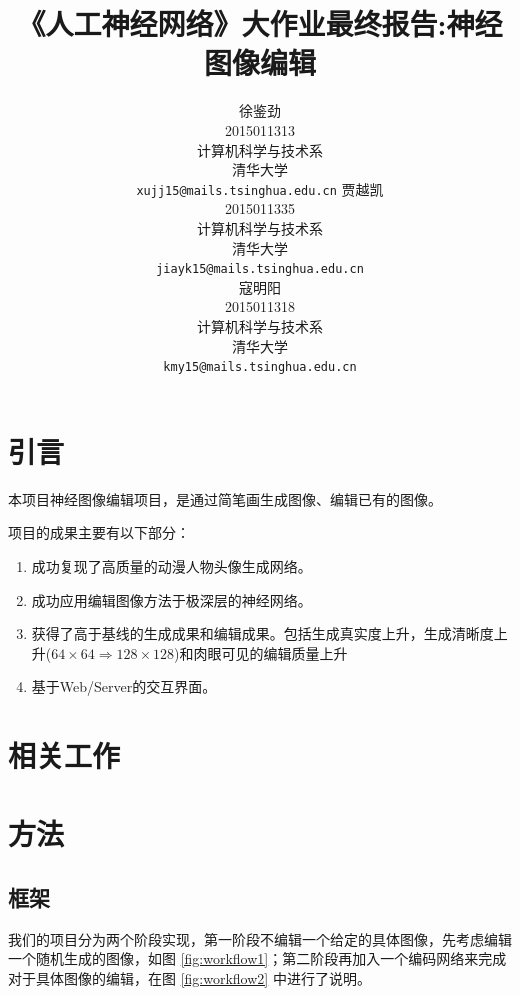 \documentclass[a4paper,12pt,UTF8]{ctexart}
\title{《人工神经网络》大作业最终报告:神经图像编辑}
\author{
  徐鉴劲 \\
  2015011313 \\
  计算机科学与技术系 \\
  清华大学 \\
  \texttt{xujj15@mails.tsinghua.edu.cn}
  \AND
  贾越凯 \\
  2015011335 \\
  计算机科学与技术系 \\
  清华大学 \\
  \texttt{jiayk15@mails.tsinghua.edu.cn} \\
  \AND
  寇明阳 \\
  2015011318 \\
  计算机科学与技术系 \\
  清华大学 \\
  \texttt{kmy15@mails.tsinghua.edu.cn} \\
}
\begin{document}
\maketitle

\begin{abstract}

\end{abstract}


\section{引言}

本项目神经图像编辑项目，是通过简笔画生成图像、编辑已有的图像。


项目的成果主要有以下部分：

\begin{enumerate}
\item 成功复现了高质量的动漫人物头像生成网络。
\item 成功应用编辑图像方法于极深层的神经网络。
\item 获得了高于基线的生成成果和编辑成果。包括生成真实度上升，生成清晰度上升($64 \times 64 \Rightarrow 128 \times 128$)和肉眼可见的编辑质量上升
\item 基于Web/Server的交互界面。
\end{enumerate}

\section{相关工作}


\section{方法}

\subsection{框架}

我们的项目分为两个阶段实现，第一阶段不编辑一个给定的具体图像，先考虑编辑一个随机生成的图像，如图 \ref{fig:workflow1}；第二阶段再加入一个编码网络来完成对于具体图像的编辑，在图 \ref{fig:workflow2} 中进行了说明。
\end{document}
